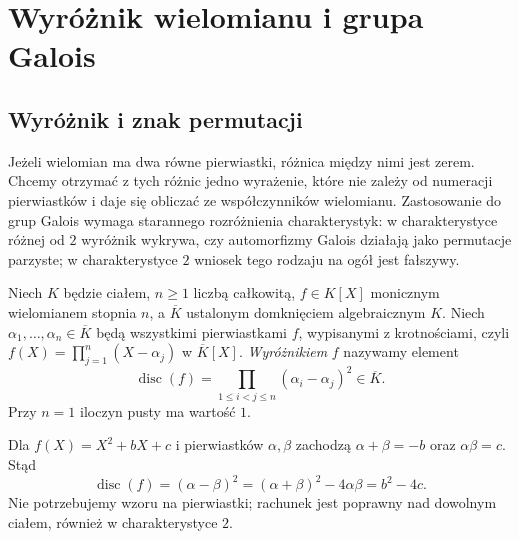 \chapter{Wyróżnik wielomianu i grupa Galois}\label{aa:ch:discriminant-galois}
\section{Wyróżnik i znak permutacji}

Jeżeli wielomian ma dwa równe pierwiastki, różnica między
nimi jest zerem. Chcemy otrzymać z tych różnic jedno
wyrażenie, które nie zależy od numeracji pierwiastków
i daje się obliczać ze współczynników wielomianu.
Zastosowanie do grup Galois wymaga starannego rozróżnienia
charakterystyk: w charakterystyce różnej od $2$
wyróżnik wykrywa, czy automorfizmy Galois działają
jako permutacje parzyste; w charakterystyce $2$
wniosek tego rodzaju na ogół jest fałszywy.

\begin{definicja}\label{aa:def:polynomial-discriminant}
Niech $K$ będzie ciałem, $n\ge1$ liczbą całkowitą,
$f\in K[X]$ monicznym wielomianem stopnia $n$,
a $\overline K$ ustalonym domknięciem algebraicznym $K$.
Niech $\alpha_1,\ldots,\alpha_n\in\overline K$
będą wszystkimi pierwiastkami $f$, wypisanymi
z krotnościami, czyli
$f(X)=\prod_{j=1}^n(X-\alpha_j)$ w $\overline K[X]$.
\emph{Wyróżnikiem} $f$ nazywamy element
\[
 \operatorname{disc}(f)=
 \prod_{1\le i<j\le n}(\alpha_i-\alpha_j)^2\in\overline K.
\]
Przy $n=1$ iloczyn pusty ma wartość $1$.
\end{definicja}

\begin{przyklad}
Dla $f(X)=X^2+bX+c$ i pierwiastków $\alpha,\beta$
zachodzą $\alpha+\beta=-b$ oraz $\alpha\beta=c$.
Stąd
\[
 \operatorname{disc}(f)=(\alpha-\beta)^2
 =(\alpha+\beta)^2-4\alpha\beta=b^2-4c.
\]
Nie potrzebujemy wzoru na pierwiastki; rachunek jest
poprawny nad dowolnym ciałem, również w charakterystyce $2$.
\end{przyklad}

